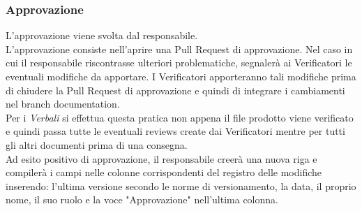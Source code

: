 \subsubsection{Approvazione}
L’approvazione viene svolta dal responsabile.\\
L'approvazione consiste nell'aprire una Pull Request di approvazione. Nel caso in cui il responsabile riscontrasse ulteriori problematiche, segnalerà ai Verificatori le eventuali modifiche da apportare. I Verificatori apporteranno tali modifiche prima di chiudere la Pull Request di approvazione e quindi di integrare i cambiamenti nel branch documentation.\\
Per i \textit{Verbali} si effettua questa pratica non appena il file prodotto viene verificato e quindi passa tutte le eventuali reviews create dai Verificatori mentre per tutti gli altri documenti prima di una consegna.\\
Ad esito positivo di approvazione, il responsabile creerà una nuova riga e compilerà i campi nelle colonne corrispondenti del registro delle modifiche inserendo: l'ultima versione secondo le norme di versionamento, la data, il proprio nome, il suo ruolo e la voce "Approvazione" nell'ultima colonna.